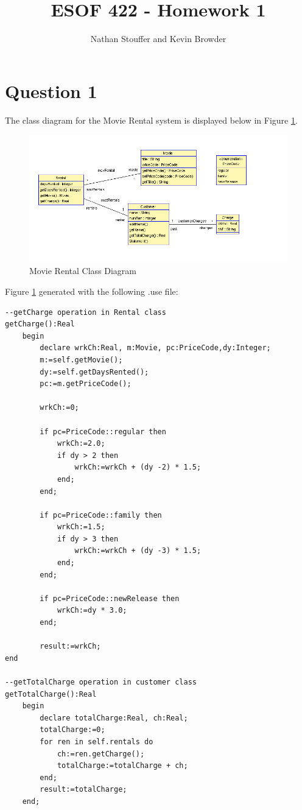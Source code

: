 \documentclass{article}
\begin{document}
	
\title{ESOF 422 - Homework 1}
\author{Nathan Stouffer and Kevin Browder}

\maketitle
\newpage

\section*{Question 1}

	The class diagram for the Movie Rental system is displayed below in Figure \ref{fig:q1class}.
	\begin{figure}[h]
		\includegraphics[width=\linewidth]{Q1Class.PNG}
		\caption{Movie Rental Class Diagram}
		\label{fig:q1class}
	\end{figure}
	
	\noindent
	Figure \ref{fig:q1class} generated with the following .use file:
\begin{Verbatim}
--getCharge operation in Rental class
getCharge():Real
	begin
		declare wrkCh:Real, m:Movie, pc:PriceCode,dy:Integer;
		m:=self.getMovie();
		dy:=self.getDaysRented();
		pc:=m.getPriceCode();

		wrkCh:=0;

		if pc=PriceCode::regular then
			wrkCh:=2.0;
			if dy > 2 then
				wrkCh:=wrkCh + (dy -2) * 1.5;
			end;
		end;

		if pc=PriceCode::family then
			wrkCh:=1.5;
			if dy > 3 then
				wrkCh:=wrkCh + (dy -3) * 1.5;
			end;
		end;

		if pc=PriceCode::newRelease then
			wrkCh:=dy * 3.0;
		end;

		result:=wrkCh;
end

--getTotalCharge operation in customer class
getTotalCharge():Real
	begin
		declare totalCharge:Real, ch:Real;
		totalCharge:=0;
		for ren in self.rentals do
			ch:=ren.getCharge();
			totalCharge:=totalCharge + ch;
		end;
		result:=totalCharge;
	end;
\end{Verbatim}
	
\end{document}
